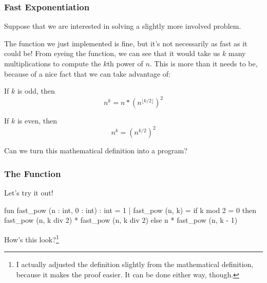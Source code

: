 \documentclass[aspectratio=169, handout]{beamer}
\begin{document}

\begin{frame}[fragile]
  \frametitle{Fast Exponentiation}

  Suppose that we are interested in solving a slightly more involved problem.

  \pause
  \vspace{\fill}

  The  function we just implemented is fine, but it's not necessarily
  as fast as it could be! From eyeing the function, we can see that it would take
  us $k$ many multiplications to compute the $k$th power of $n$. This is more
  than it needs to be, because of a nice fact that we can take advantage of:

  \pause
  \vspace{\fill}

  If $k$ is odd, then $$n^k = n * \left (n^{\lfloor k/2 \rfloor} \right )^2$$

  \pause

  If $k$ is even, then $$n^k = \left (n^{k/2} \right )^2$$

  \pause
  \vspace{\fill}

  Can we turn this mathematical definition into a program?
\end{frame}

\begin{frame}[fragile]
  \frametitle{The  Function}

  Let's try it out!

  \pause
  \begin{codeblock}
    fun fast_pow (n : int, 0 : int) : int = 1
      | fast_pow (n, k) =
          if k mod 2 = 0 then
            fast_pow (n, k div 2) * fast_pow (n, k div 2)
          else
            n * fast_pow (n, k - 1)
  \end{codeblock}

  \vspace{\fill}

  How's this look?\footnote{I actually adjusted the definition slightly from the
  mathematical definition, because it makes the proof easier. It can be
  done either way, though.}
\end{frame}
\end{document}
